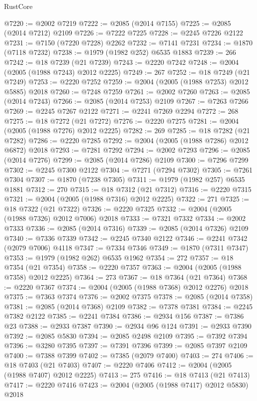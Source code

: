 \begin{lexlean}{RustCore}
\begin{coremodule}
@7220 := @2002 @7219
@7222 := @2085 (@2014 @7155)
@7225 := @2085 (@2014 @7212) @2109
@7226 := @7222 @7225
@7228 := @2245 @7226 @2122
@7231 := @7150 (@7220 @7228) @2262
@7232 := @7141 @7231
@7234 := @1870 (@7118 @7232)
@7238 := @1979 (@1982 @252) @6535 @1883
@7239 := 266
@7242 := @18 @7239 (@21 @7239)
@7243 := @2220 @7242
@7248 := @2004 (@2005 (@1988 @7243) @2012 @2225)
@7249 := 267
@7252 := @18 @7249 (@21 @7249)
@7253 := @2220 @7252
@7259 := @2004 (@2005 (@1988 @7253) @2012 @5885) @2018
@7260 := @7248 @7259
@7261 := @2002 @7260
@7263 := @2085 (@2014 @7243)
@7266 := @2085 (@2014 @7253) @2109
@7267 := @7263 @7266
@7269 := @2245 @7267 @2122
@7271 := @2241 @7269 @2294
@7272 := 268
@7275 := @18 @7272 (@21 @7272)
@7276 := @2220 @7275
@7281 := @2004 (@2005 (@1988 @7276) @2012 @2225)
@7282 := 269
@7285 := @18 @7282 (@21 @7282)
@7286 := @2220 @7285
@7292 := @2004 (@2005 (@1988 @7286) @2012 @6872) @2018
@7293 := @7281 @7292
@7294 := @2002 @7293
@7296 := @2085 (@2014 @7276)
@7299 := @2085 (@2014 @7286) @2109
@7300 := @7296 @7299
@7302 := @2245 @7300 @2122
@7304 := @7271 (@7294 @7302)
@7305 := @7261 @7304
@7307 := @1870 (@7238 @7305)
@7311 := @1979 (@1982 @257) @6535 @1881
@7312 := 270
@7315 := @18 @7312 (@21 @7312)
@7316 := @2220 @7315
@7321 := @2004 (@2005 (@1988 @7316) @2012 @2225)
@7322 := 271
@7325 := @18 @7322 (@21 @7322)
@7326 := @2220 @7325
@7332 := @2004 (@2005 (@1988 @7326) @2012 @7006) @2018
@7333 := @7321 @7332
@7334 := @2002 @7333
@7336 := @2085 (@2014 @7316)
@7339 := @2085 (@2014 @7326) @2109
@7340 := @7336 @7339
@7342 := @2245 @7340 @2122
@7346 := @2241 @7342 (@2079 @7006) @4118
@7347 := @7334 @7346
@7349 := @1870 (@7311 @7347)
@7353 := @1979 (@1982 @262) @6535 @1962
@7354 := 272
@7357 := @18 @7354 (@21 @7354)
@7358 := @2220 @7357
@7363 := @2004 (@2005 (@1988 @7358) @2012 @2225)
@7364 := 273
@7367 := @18 @7364 (@21 @7364)
@7368 := @2220 @7367
@7374 := @2004 (@2005 (@1988 @7368) @2012 @2276) @2018
@7375 := @7363 @7374
@7376 := @2002 @7375
@7378 := @2085 (@2014 @7358)
@7381 := @2085 (@2014 @7368) @2109
@7382 := @7378 @7381
@7384 := @2245 @7382 @2122
@7385 := @2241 @7384
@7386 := @2934 @156
@7387 := @7386 @23
@7388 := @2933 @7387
@7390 := @2934 @96 @124
@7391 := @2933 @7390
@7392 := @2085 @5830
@7394 := @2085 @2498 @2109
@7395 := @7392 @7394
@7396 := @3280 @7395
@7397 := @7391 @7396
@7399 := @2085 @7397 @2109
@7400 := @7388 @7399
@7402 := @7385 (@2079 @7400)
@7403 := 274
@7406 := @18 @7403 (@21 @7403)
@7407 := @2220 @7406
@7412 := @2004 (@2005 (@1988 @7407) @2012 @2225)
@7413 := 275
@7416 := @18 @7413 (@21 @7413)
@7417 := @2220 @7416
@7423 := @2004 (@2005 (@1988 @7417) @2012 @5830) @2018

\end{coremodule}
\end{lexlean}
